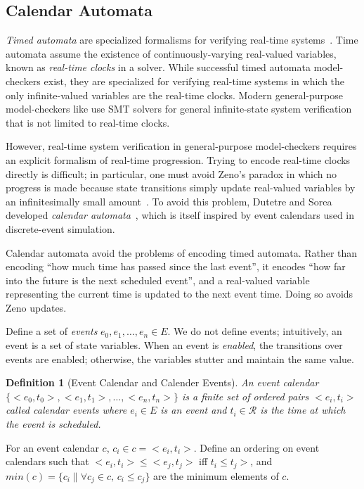 \documentclass{IEEEtran/IEEEtran}
\newtheorem{definition}{Definition}
\newcommand{\lee}[1]{ } %
\newcommand{\lee}[1]{ {\color{blue}$<$lee: #1$>$} } %
\begin{document}
\subsection{Calendar Automata}\label{sec:calendar}
\emph{Timed automata} are specialized formalisms for verifying real-time systems~\cite{}. Time automata assume the existence of continuously-varying real-valued variables, known as \emph{real-time clocks} in a solver. While successful timed automata model-checkers exist, they are specialized for verifying real-time systems in which the only infinite-valued variables are the real-time clocks. Modern general-purpose model-checkers like \lee{name some} use SMT solvers for general infinite-state system verification that is not limited to real-time clocks.

However, real-time system verification in general-purpose model-checkers requires an explicit formalism of real-time progression. Trying to encode real-time clocks directly is difficult; in particular, one must avoid Zeno's paradox in which no progress is made because state transitions simply update real-valued variables by an infinitesimally small amount~\cite{bruno,lamport}. To avoid this problem, Dutetre and Sorea developed \emph{calendar automata}~\cite{bruno}, which is itself inspired by event calendars used in discrete-event simulation.

Calendar automata avoid the problems of encoding timed automata. Rather than encoding ``how much time has passed since the last event'', it encodes ``how far into the future is the next scheduled event'', and a real-valued variable representing the current time is updated to the next event time. Doing so avoids Zeno updates.


Define a set of \emph{events} $e_0, e_1, \ldots, e_n \in E$. We do not define events; intuitively, an event is a set of state variables. When an event is \emph{enabled}, the transitions over events are enabled; otherwise, the variables stutter and maintain the same value.

\begin{definition}[Event Calendar and Calender Events]
An \emph{event calendar} $\{ <e_0, t_0>, <e_1, t_1>, \ldots, <e_n, t_n> \}$ is a finite set of ordered pairs $<e_i, t_i>$ called \emph{calendar events} where $e_i \in E$ is an event and $t_i \in \mathcal{R}$ is the time at which the event is scheduled.
\end{definition}

For an event calendar $c$, $c_i \in c = <e_i, t_i>$. Define an ordering on event calendars such that $<e_i, t_i> \leq <e_j, t_j>$ iff $t_i \leq t_j>$, and $min(c) = \{ c_i \| \forall c_j \in c, \, c_i \leq c_j  \}$ are the minimum elements of $c$.
\end{document}
